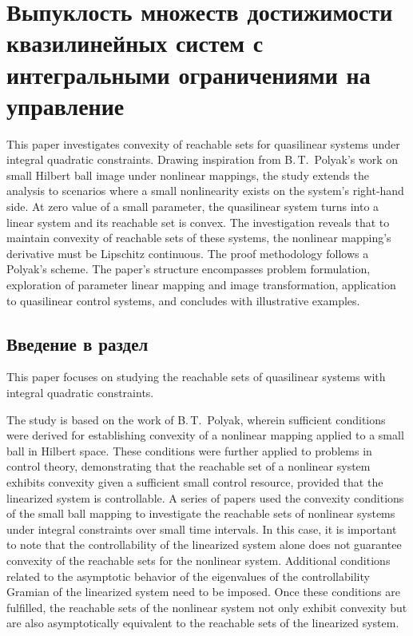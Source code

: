\documentclass[../main.tex]{subfiles}
\begin{document}
\clearpage
\section{Выпуклость множеств достижимости квазилинейных систем с интегральными ограничениями на управление}
This paper investigates convexity of reachable sets for quasilinear systems under integral quadratic constraints. Drawing inspiration from B.\,T.~Polyak's work on small Hilbert ball image under nonlinear mappings, the study extends the analysis to scenarios where a small nonlinearity exists on the system's right-hand side. At zero value of a small parameter, the quasilinear system turns into a linear system and its reachable set is convex.  The investigation reveals that to maintain convexity of reachable sets of these systems, the nonlinear mapping's derivative must be Lipschitz continuous. The proof methodology follows a Polyak's scheme. The paper's structure encompasses problem formulation, exploration of parameter linear mapping and image transformation, application to quasilinear control systems, and concludes with illustrative examples. 

\subsection{Введение в раздел}

This paper focuses on studying the reachable sets of quasilinear systems with integral quadratic constraints.

The study is based on the work of B.\,T.~Polyak\cite{Polyak2001, Polyak2004}, wherein sufficient conditions were derived for establishing convexity of a nonlinear mapping applied to a small ball in Hilbert space. These conditions were further applied to problems in control theory, demonstrating that the reachable set of a nonlinear system exhibits convexity given a sufficient small control resource, provided that the linearized system is controllable. A series of papers \cite{GusOsSteklov, GusevUMJ, Osipov, GusOsUdmurt} used the convexity conditions of the small ball mapping to investigate the reachable sets of nonlinear systems under integral constraints over small time intervals. 
In this case, it is important to note that the controllability of the linearized system alone does not guarantee convexity of the reachable sets for the nonlinear system. Additional conditions related to the asymptotic behavior of the eigenvalues of the controllability Gramian of the linearized system need to be imposed.  Once these conditions are fulfilled, the reachable sets of the nonlinear system not only exhibit convexity but are also asymptotically equivalent to the reachable sets of the linearized system.
\end{document}
